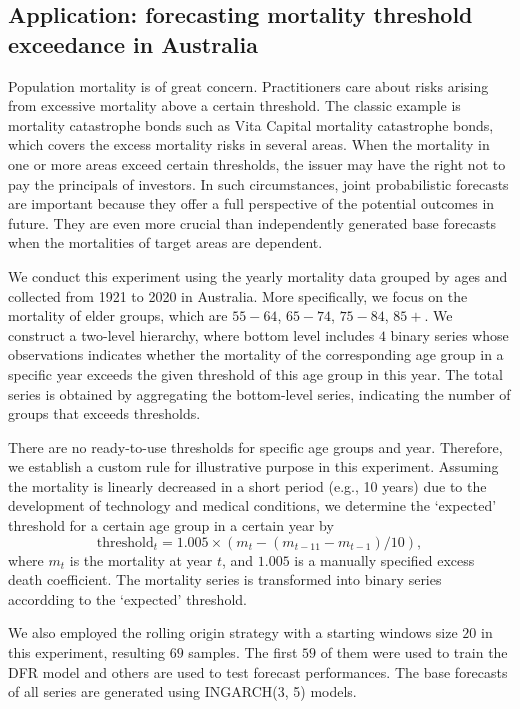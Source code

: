 \documentclass[a4paper,review,12pt,authoryear]{elsarticle}
\begin{document}
\subsection{Application: forecasting mortality threshold exceedance in Australia}
\label{sec:application_mortality}
Population mortality is of great concern. 
Practitioners care about risks arising from excessive mortality above a certain threshold. 
The classic example is mortality catastrophe bonds such as Vita Capital mortality catastrophe bonds, which covers the excess mortality risks in several areas.
When the mortality in one or more areas exceed certain thresholds, the issuer may have the right not to pay the principals of investors.
In such circumstances, joint probabilistic forecasts are important because they offer a full perspective of the potential outcomes in future.
They are even more crucial than independently generated base forecasts when the mortalities of target areas are dependent.

We conduct this experiment using the yearly mortality data grouped by ages and collected from 1921 to 2020 in Australia.
More specifically, we focus on the mortality of elder groups, which are $55-64$, $65-74$, $75-84$, $85+$. 
We construct a two-level hierarchy, where bottom level includes 
$4$ binary series whose observations indicates whether the mortality of the corresponding age group in a specific year exceeds the given threshold of this age group in this year.
The total series is obtained by aggregating the bottom-level series, indicating the number of groups that exceeds thresholds.

There are no ready-to-use thresholds for specific age groups and year. 
Therefore, we establish a custom rule for illustrative purpose in this experiment. 
Assuming the mortality is linearly decreased in a short period (e.g., 10 years) due to the development of technology and medical conditions, we determine the `expected' threshold for a certain age group in a certain year by
\[
  \text{threshold}_t = 1.005 \times (m_t - (m_{t-11} - m_{t-1})/10),
\]
where $m_t$ is the mortality at year $t$, and $1.005$ is a manually specified excess death coefficient.
The mortality series is transformed into binary series accordding to the `expected' threshold. 

We also employed the rolling origin strategy with a starting windows size $20$ in this experiment, resulting $69$ samples.
The first $59$ of them were used to train the DFR model and others are used to test forecast performances.
The base forecasts of all series are generated using INGARCH(3, 5) models.
\end{document}
